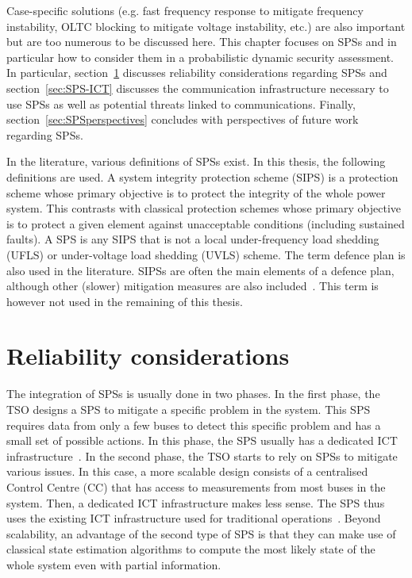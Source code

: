 Case-specific solutions (e.g. fast frequency response to mitigate frequency instability, OLTC blocking to mitigate voltage instability, etc.) are also important but are too numerous to be discussed here. This chapter focuses on SPSs and in particular how to consider them in a probabilistic dynamic security assessment. In particular, section~\ref{sec:SPSreliability} discusses reliability considerations regarding SPSs and section~\ref{sec:SPS-ICT} discusses the communication infrastructure necessary to use SPSs as well as potential threats linked to communications. Finally, section~\ref{sec:SPSperspectives} concludes with perspectives of future work regarding SPSs.

In the literature, various definitions of SPSs exist. In this thesis, the following definitions are used. A system integrity protection scheme (SIPS) is a protection scheme whose primary objective is to protect the integrity of the whole power system. This contrasts with classical protection schemes whose primary objective is to protect a given element against unacceptable conditions (including sustained faults). A SPS is any SIPS that is not a local under-frequency load shedding (UFLS) or under-voltage load shedding (UVLS) scheme. The term defence plan is also used in the literature. SIPSs are often the main elements of a defence plan, although other (slower) mitigation measures are also included~\cite{CigreDefensePlan, ENTSOEdefencePlan}. This term is however not used in the remaining of this thesis.

\section{Reliability considerations}
\label{sec:SPSreliability}

The integration of SPSs is usually done in two phases. In the first phase, the TSO designs a SPS to mitigate a specific problem in the system. This SPS requires data from only a few buses to detect this specific problem and has a small set of possible actions. In this phase, the SPS usually has a dedicated ICT infrastructure~\cite{BelgiumSPS}. In the second phase, the TSO starts to rely on SPSs to mitigate various issues. In this case, a more scalable design consists of a centralised Control Centre (CC) that has access to measurements from most buses in the system. Then, a dedicated ICT infrastructure makes less sense. The SPS thus uses the existing ICT infrastructure used for traditional operations~\cite{GeorgiaSPS, UruguaySPS}. Beyond scalability, an advantage of the second type of SPS is that they can make use of classical state estimation algorithms to compute the most likely state of the whole system even with partial information.

